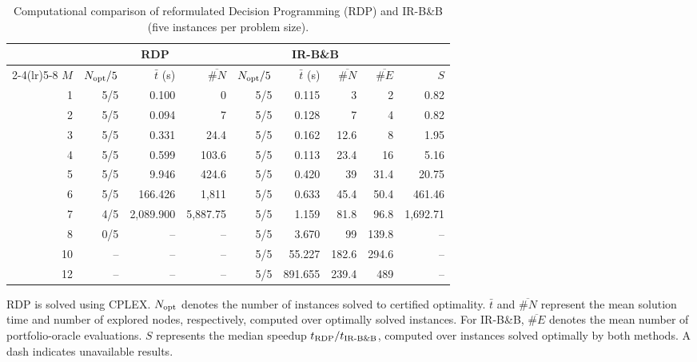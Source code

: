 \documentclass[11pt,a4paper]{article}
\begin{document}
\begin{table}[H]
\centering
\begin{threeparttable}
\caption{Computational comparison of reformulated Decision Programming (RDP) and IR-B\&B (five instances per problem size).}\label{tab:rdp-irbb}
\setlength{\tabcolsep}{4pt}
{\scriptsize
\begin{tabular}{r rrr rrrr r}
\toprule
& \multicolumn{3}{c}{RDP} & \multicolumn{4}{c}{IR-B\&B} & \\
\cmidrule(lr){2-4}\cmidrule(lr){5-8}
$M$ & $N_{\rm opt}/5$ & $\bar t$ (s) & $\overline{\#N}$
& $N_{\rm opt}/5$ & $\bar t$ (s) & $\overline{\#N}$ & $\overline{\#E}$ & $S$ \\
\midrule
1 & 5/5 & 0.100 & 0 & 5/5 & 0.115 & 3 & 2 & 0.82 \\
2 & 5/5 & 0.094 & 7 & 5/5 & 0.128 & 7 & 4 & 0.82 \\
3 & 5/5 & 0.331 & 24.4 & 5/5 & 0.162 & 12.6 & 8 & 1.95 \\
4 & 5/5 & 0.599 & 103.6 & 5/5 & 0.113 & 23.4 & 16 & 5.16 \\
5 & 5/5 & 9.946 & 424.6 & 5/5 & 0.420 & 39 & 31.4 & 20.75 \\
6 & 5/5 & 166.426 & 1,811 & 5/5 & 0.633 & 45.4 & 50.4 & 461.46 \\
7 & 4/5 & 2,089.900 & 5,887.75 & 5/5 & 1.159 & 81.8 & 96.8 & 1,692.71 \\
8 & 0/5 & -- & -- & 5/5 & 3.670 & 99 & 139.8 & -- \\
10 & -- & -- & -- & 5/5 & 55.227 & 182.6 & 294.6 & -- \\
12 & -- & -- & -- & 5/5 & 891.655 & 239.4 & 489 & -- \\
\bottomrule
\end{tabular}}
\begin{tablenotes}[flushleft]\footnotesize
\item RDP is solved using CPLEX. $N_{\rm opt}$ denotes the number of instances solved to certified optimality. $\bar t$ and $\overline{\#N}$ represent the mean solution time and number of explored nodes, respectively, computed over optimally solved instances. For IR-B\&B, $\overline{\#E}$ denotes the mean number of portfolio-oracle evaluations. $S$ represents the median speedup $t_{\rm RDP}/t_{\rm IR\text{-}B\&B}$, computed over instances solved optimally by both methods. A dash indicates unavailable results.
\end{tablenotes}
\end{threeparttable}
\end{table}
\end{document}
